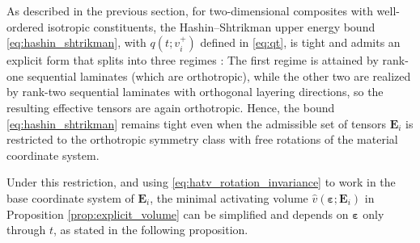 \documentclass[preprint,3p]{elsarticle}
\newcommand{\tenss}[1]{\bm{\mathbf{#1}}}            %
\newcommand{\tensf}[1]{\bm{\mathbf{#1}}}            %
\newcommand{\strain}{\tenss{\varepsilon}}           %
\newcommand{\Ei}{\tensf{E}_i}                       %
\begin{document}
As described in the previous section, for two-dimensional composites with well-ordered isotropic constituents, the Hashin--Shtrikman upper energy bound \eqref{eq:hashin_shtrikman}, with $q(t;v_i^+)$ defined in \eqref{eq:qt}, is tight and admits an explicit form that splits into three regimes \citep{Allaire1993}: The first regime is attained by rank-one sequential laminates (which are orthotropic), while the other two are realized by rank-two sequential laminates with orthogonal layering directions, so the resulting effective tensors are again orthotropic. Hence, the bound \eqref{eq:hashin_shtrikman} remains tight even when the admissible set of tensors $\Ei$ is restricted to the orthotropic symmetry class with free rotations of the material coordinate system.

Under this restriction, and using \eqref{eq:hatv_rotation_invariance} to work in the base coordinate system of $\Ei$, the minimal activating volume $\hat{v}(\strain;\Ei)$ in Proposition \ref{prop:explicit_volume} can be simplified and depends on $\strain$ only through $t$, as stated in the following proposition.
\end{document}
